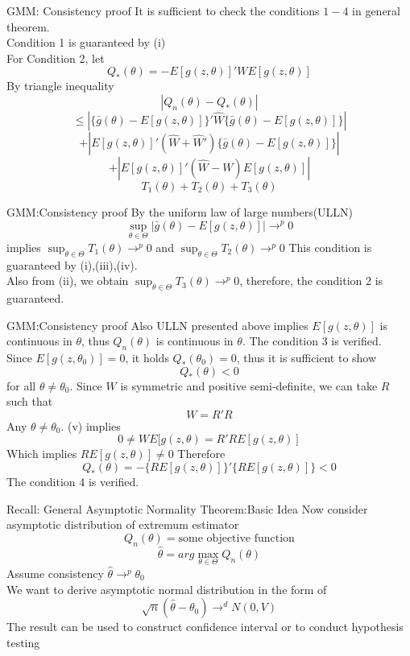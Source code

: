 \documentclass{beamer}
\begin{document}
\begin{frame}{GMM: Consistency proof}
	It is sufficient to check the conditions $1-4$ in general theorem. \\
	Condition 1 is guaranteed by (i) \\
	For Condition 2, let
	\[Q_*(\theta) = -E[g(z,\theta)]'WE[g(z,\theta)]\]
	By triangle inequality
	\[|Q_n(\theta) - Q_*(\theta)|\]
	\[\leq |\{\bar{g}(\theta) - E[g(z,\theta)]\}' \hat{W} \{\bar{g}(\theta) - E[g(z,\theta)]\}|\]
	\[+|E[g(z,\theta)]'(\hat{W} + \hat{W}') \{\bar{g}(\theta) - E[g(z,\theta)]\}|\]
	\[+|E[g(z,\theta)]'(\hat{W} - W)E[g(z,\theta)]|\]
	\[T_1(\theta) + T_2(\theta) + T_3(\theta)\]
\end{frame}
\begin{frame}{GMM:Consistency proof}
	By the uniform law of large numbers(ULLN)
	\[\sup_{\theta \in \Theta} |\bar{g}(\theta) - E[g(z,\theta)]| \rightarrow^p 0\]
	implies $\sup_{\theta \in \Theta} T_1(\theta) \rightarrow^p 0 $ and $\sup_{\theta \in \Theta} T_2(\theta) \rightarrow^p 0 $
	This condition is guaranteed by (i),(iii),(iv). \\
	Also from (ii), we obtain $\sup_{\theta \in \Theta} T_3(\theta) \rightarrow^p 0$, therefore, the condition 2 is guaranteed.
\end{frame}
\begin{frame}{GMM:Consistency proof}
	Also ULLN presented above implies $E[g(z,\theta)]$ is continuous in $\theta$, thus $Q_n(\theta)$ is continuous in $\theta$. The condition 3 is verified. \\
	Since $E[g(z,\theta_0)]=0$, it holds $Q_*(\theta_0)=0$, thus it is sufficient to show
	\[Q_*(\theta) < 0\]
	for all $\theta \neq \theta_0$. Since $W$ is symmetric and positive semi-definite, we can take $R$ such that 
	\[W = R'R\]
	Any $\theta \neq \theta_0$. (v) implies 
	\[0 \neq WE[g(z,\theta) = R'RE[g(z,\theta)]\]
		Which implies $RE[g(z,\theta)] \neq 0$
		Therefore
		\[Q_*(\theta) = -\{RE[g(z,\theta)]\}' \{RE[g(z,\theta)]\}<0\]
		The condition 4 is verified.
\end{frame}
\begin{frame}{Recall: General Asymptotic Normality Theorem:Basic Idea}
	Now consider asymptotic distribution of extremum estimator
	\[Q_n(\theta) = \text{some objective function}\]
	\[\hat{\theta} = arg \max_{\theta \in \Theta} Q_n(\theta)\]
	Assume consistency $\hat{\theta} \rightarrow^p \theta_0$ \\
	We want to derive asymptotic normal distribution in the form of 
	\[\sqrt{n} (\hat{\theta} - \theta_0) \rightarrow^d N(0,V)\] 
	The result can be used to construct confidence interval or to conduct hypothesis testing
\end{frame}
\end{document}
